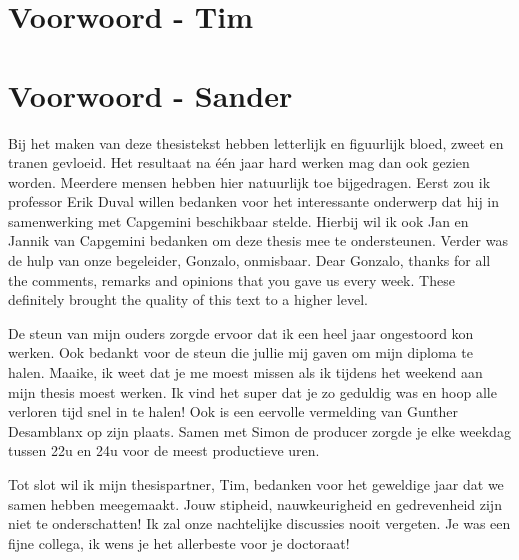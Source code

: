 \documentclass[master=cws,dutch,masteroption={vs,gs},inputenc=utf8]{kulemt}
\begin{document}

\chapter*{Voorwoord - Tim}

\chapter*{Voorwoord - Sander}
Bij het maken van deze thesistekst hebben letterlijk en figuurlijk bloed, zweet en tranen gevloeid.
Het resultaat na één jaar hard werken mag dan ook gezien worden.
Meerdere mensen hebben hier natuurlijk toe bijgedragen.
Eerst zou ik professor Erik Duval willen bedanken voor het interessante onderwerp dat hij in samenwerking met Capgemini beschikbaar stelde.
Hierbij wil ik ook Jan en Jannik van Capgemini bedanken om deze thesis mee te ondersteunen.
Verder was de hulp van onze begeleider,  Gonzalo,  onmisbaar.
Dear Gonzalo,  thanks for all the comments,  remarks and opinions that you gave us every week.
These definitely brought the quality of this text to a higher level.

De steun van mijn ouders zorgde ervoor dat ik een heel jaar ongestoord kon werken.
Ook bedankt voor de steun die jullie mij gaven om mijn diploma te halen.
Maaike,  ik weet dat je me moest missen als ik tijdens het weekend aan mijn thesis moest werken.
Ik vind het super dat je zo geduldig was en hoop alle verloren tijd snel in te halen!
Ook is een eervolle vermelding van Gunther Desamblanx op zijn plaats.
Samen met Simon de producer zorgde je elke weekdag tussen 22u en 24u voor de meest productieve uren.

Tot slot wil ik mijn thesispartner, Tim,  bedanken voor het geweldige jaar dat we samen hebben meegemaakt.
Jouw stipheid, nauwkeurigheid en gedrevenheid zijn niet te onderschatten!
Ik zal onze nachtelijke discussies nooit vergeten.
Je was een fijne collega,  ik wens je het allerbeste voor je doctoraat!

\tableofcontents*
\end{document}
